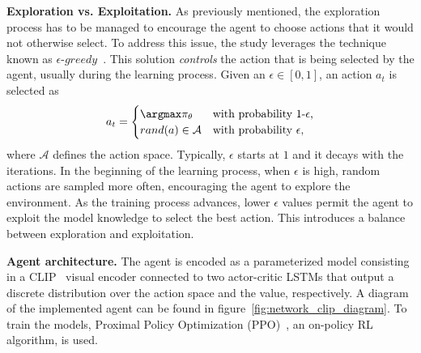 \textbf{Exploration vs. Exploitation.}
As previously mentioned, the exploration process has to be managed to encourage the agent to choose actions that it would not otherwise select.
To address this issue, the study leverages the technique known as $\epsilon\text{-}greedy$~\cite{mnih2013}.
This solution \emph{controls} the action that is being selected by the agent, usually during the learning process.
Given an $\epsilon \in [0, 1]$, an action $a_t$ is selected as
\begin{equation}
    \label{eq:eps-greedy}
    a_t = \begin{cases}
              \argmax\pi_\theta & \mbox{with probability 1-$\epsilon$,}     \\
              rand(a) \in \mathcal{A} & \mbox{with probability $\epsilon$,} \\
    \end{cases}
\end{equation}
where $\mathcal{A}$ defines the action space.
Typically, $\epsilon$ starts at $1$ and it decays with the iterations.
In the beginning of the learning process, \ie when $\epsilon$ is high, random actions are sampled more often, encouraging the agent to explore the environment.
As the training process advances, lower $\epsilon$ values permit the agent to exploit the model knowledge to select the best action.
This introduces a balance between exploration and exploitation.

\textbf{Agent architecture.} The agent is encoded as a parameterized model consisting in a CLIP~\cite{khandelwal2022} visual encoder connected to two actor-critic LSTMs that output a discrete distribution over the action space and the value, respectively.
A diagram of the implemented agent can be found in figure~\ref{fig:network_clip_diagram}.
To train the models, Proximal Policy Optimization (PPO)~\cite{schulman2017}, an on-policy RL algorithm, is used.

